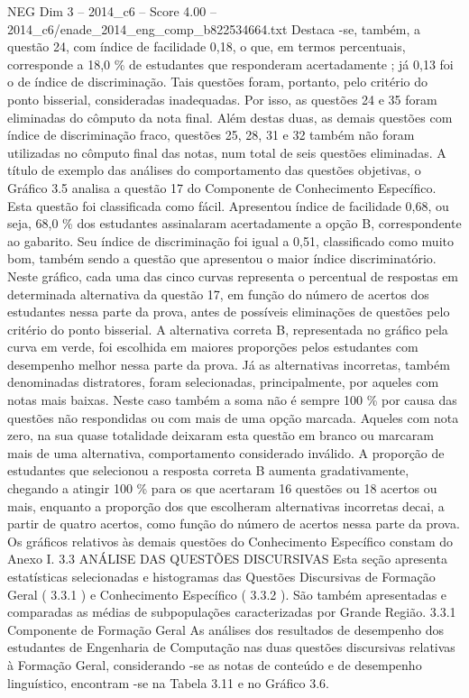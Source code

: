 \begin{textsample}{NEG Dim 3 – 2014\_c6 – Score 4.00 – 2014\_c6/enade\_2014\_eng\_comp\_b822534664.txt}
Destaca -se, também, a questão 24, com índice de facilidade 0,18, o que, em termos percentuais, corresponde a 18,0 \% de estudantes que responderam acertadamente ; já 0,13 foi o de índice de discriminação.
Tais questões foram, portanto, pelo critério do ponto bisserial, consideradas inadequadas.
Por isso, as questões 24 e 35 foram eliminadas do cômputo da nota final.
Além destas duas, as demais questões com índice de discriminação fraco, questões 25, 28, 31 e 32 também não foram utilizadas no cômputo final das notas, num total de seis questões eliminadas.
A título de exemplo das análises do comportamento das questões objetivas, o Gráfico 3.5 analisa a questão 17 do Componente de Conhecimento Específico.
Esta questão foi classificada como fácil.
Apresentou índice de facilidade 0,68, ou seja, 68,0 \% dos estudantes assinalaram acertadamente a opção B, correspondente ao gabarito.
Seu índice de discriminação foi igual a 0,51, classificado como muito bom, também sendo a questão que apresentou o maior índice discriminatório.
Neste gráfico, cada uma das cinco curvas representa o percentual de respostas em determinada alternativa da questão 17, em função do número de acertos dos estudantes nessa parte da prova, antes de possíveis eliminações de questões pelo critério do ponto bisserial.
A alternativa correta B, representada no gráfico pela curva em verde, foi escolhida em maiores proporções pelos estudantes com desempenho melhor nessa parte da prova.
Já as alternativas incorretas, também denominadas distratores, foram selecionadas, principalmente, por aqueles com notas mais baixas.
Neste caso também a soma não é sempre 100 \% por causa das questões não respondidas ou com mais de uma opção marcada.
Aqueles com nota zero, na sua quase totalidade deixaram esta questão em branco ou marcaram mais de uma alternativa, comportamento considerado inválido.
A proporção de estudantes que selecionou a resposta correta B aumenta gradativamente, chegando a atingir 100 \% para os que acertaram 16 questões ou 18 acertos ou mais, enquanto a proporção dos que escolheram alternativas incorretas decai, a partir de quatro acertos, como função do número de acertos nessa parte da prova.
Os gráficos relativos às demais questões do Conhecimento Específico constam do Anexo I. 3.3 ANÁLISE DAS QUESTÕES DISCURSIVAS Esta seção apresenta estatísticas selecionadas e histogramas das Questões Discursivas de Formação Geral ( 3.3.1 ) e Conhecimento Específico ( 3.3.2 ).
São também apresentadas e comparadas as médias de subpopulações caracterizadas por Grande Região. 3.3.1 Componente de Formação Geral As análises dos resultados de desempenho dos estudantes de Engenharia de Computação nas duas questões discursivas relativas à Formação Geral, considerando -se as notas de conteúdo e de desempenho linguístico, encontram -se na Tabela 3.11 e no Gráfico 3.6.

\end{textsample}
